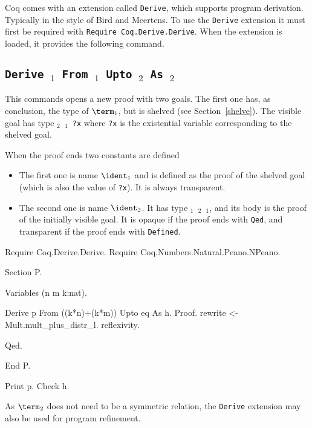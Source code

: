 

Coq comes with an extension called {\tt Derive}, which supports
program derivation. Typically in the style of Bird and Meertens. To
use the {\tt Derive} extension it must first be required with
{\tt Require Coq.Derive.Derive}. When the extension is loaded, it
provides the following command.

\subsection[\tt Derive \ident$_1$ From \term$_1$ Upto \term$_2$ As \ident$_2$]
       {\tt Derive \ident$_1$ From \term$_1$ Upto \term$_2$ As \ident$_2$}

This commands opens a new proof with two goals. The first one has, as
conclusion, the type of $\term_1$, but is shelved (see
Section~\ref{shelve}). The visible goal has type {\tt \term$_2$
\term$_1$ ?x} where {\tt ?x} is the existential variable
corresponding to the shelved goal.

When the proof ends two constants are defined
\begin{itemize}
\item The first one is name $\ident_1$ and is defined as the proof of
  the shelved goal (which is also the value of {\tt ?x}). It is always
  transparent.
\item The second one is name $\ident_2$. It has type {\tt \term$_1$
  \term$_2$ \ident$_1$}, and its body is the proof of the initially
  visible goal. It is opaque if the proof ends with {\tt Qed}, and
  transparent if the proof ends with {\tt Defined}.
\end{itemize}

\Example
\begin{coq_example*}
Require Coq.Derive.Derive.
Require Coq.Numbers.Natural.Peano.NPeano.

Section P.

Variables (n m k:nat).

\end{coq_example*}
\begin{coq_example}
Derive p From ((k*n)+(k*m)) Upto eq As h.
Proof.
rewrite <- Mult.mult_plus_distr_l.
reflexivity.
\end{coq_example}
\begin{coq_example*}
Qed.

End P.

\end{coq_example*}
\begin{coq_example}
Print p.
Check h.
\end{coq_example}

As $\term_2$ does not need to be a symmetric relation, the
{\tt Derive} extension may also be used for program refinement.
